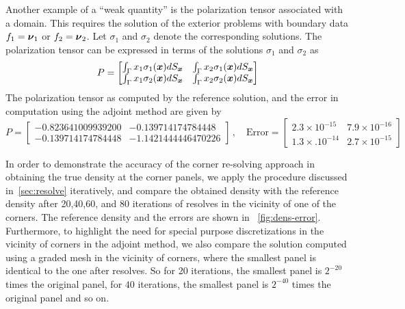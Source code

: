 Another example of a ``weak quantity'' is the polarization tensor associated with a domain. This requires the solution of the
exterior problems with boundary data $f_{1} = \boldsymbol{\nu}_{1}$ or $f_{2} = \boldsymbol{\nu}_{2}$. Let $\sigma_{1}$ and $\sigma_{2}$ denote
the corresponding solutions. The polarization tensor can be expressed in terms of the solutions $\sigma_{1}$ and $\sigma_{2}$
as
\begin{equation}
P = \begin{bmatrix}
\int_{\Gamma} x_{1} \sigma_{1}(\boldsymbol{x}) dS_{\boldsymbol{x}} & \int_{\Gamma} x_{2} \sigma_{1}(\boldsymbol{x}) dS_{\boldsymbol{x}} \\
\int_{\Gamma} x_{1} \sigma_{2}(\boldsymbol{x}) dS_{\boldsymbol{x}} & \int_{\Gamma} x_{2} \sigma_{2}(\boldsymbol{x}) dS_{\boldsymbol{x}} 
\end{bmatrix}
\end{equation}
The polarization tensor as computed by the reference solution, and the error in computation using the adjoint method
are given by
\begin{equation}
P = \begin{bmatrix}
-0.823641009939200 & -0.139714174784448 \\
 -0.139714174784448 &  -1.1421444446470226
\end{bmatrix} \, , \quad \text{Error} = 
\begin{bmatrix} 
2.3 \times 10^{-15} & 7.9 \times 10^{-16} \\
1.3 \times. 10^{-14} & 2.7 \times 10^{-15}
\end{bmatrix}
\end{equation}

In order to demonstrate the accuracy of the corner re-solving approach in obtaining the true density at the corner panels, we  apply the procedure
discussed in~\cref{sec:resolve} iteratively, and compare the obtained density with the reference density after 20,40,60, and
80 iterations of resolves in the vicinity of one of the corners. The reference density and the errors are shown in ~\cref{fig:dens-error}. Furthermore, to highlight the need for special purpose discretizations in the vicinity of corners in the adjoint method, we also compare the solution computed using a graded mesh in the vicinity of corners, where the smallest panel is identical
to the one after resolves. So for 20 iterations, the smallest panel is $2^{-20}$ times the original panel, for $40$ iterations,
the smallest panel is $2^{-40}$ times the original panel and so on. 

